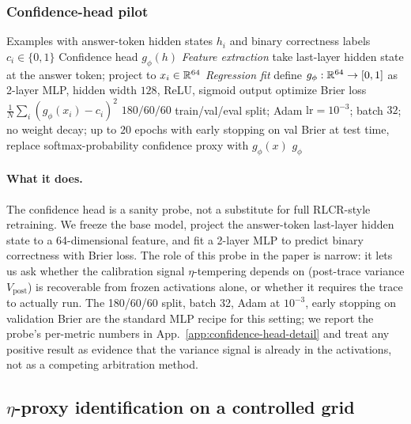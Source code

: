 \subsubsection{Confidence-head pilot}

\begin{algorithm}[H]
\small
\caption{Confidence-head pilot.  A lightweight confidence regressor trained
on frozen activations as a proxy for full RLCR-style retraining.}
\begin{algorithmic}
\Require Examples with answer-token hidden states $h_i$ and binary correctness
labels $c_i\in\{0,1\}$
\Ensure Confidence head $g_\phi(h)$
\Statex \textit{Feature extraction}
  \State take last-layer hidden state at the answer token;
  project to $x_i\in\mathbb{R}^{64}$
\EndFor
\Statex \textit{Regression fit}
\State define $g_\phi:\mathbb{R}^{64}\to[0,1]$ as 2-layer MLP, hidden width $128$,
ReLU, sigmoid output
\State optimize Brier loss $\tfrac{1}{N}\sum_i(g_\phi(x_i)-c_i)^2$
\State $180/60/60$ train/val/eval split; Adam $\mathrm{lr}\!=\!10^{-3}$;
batch $32$; no weight decay; up to $20$ epochs with early stopping on val Brier
\State at test time, replace softmax-probability confidence proxy with $g_\phi(x)$
\State \Return $g_\phi$
\end{algorithmic}
\end{algorithm}

\paragraph{What it does.} The confidence head is a sanity probe, not a substitute for full RLCR-style retraining. We freeze the base model, project the answer-token last-layer hidden state to a 64-dimensional feature, and fit a 2-layer MLP to predict binary correctness with Brier loss. The role of this probe in the paper is narrow: it lets us ask whether the calibration signal $\eta$-tempering depends on (post-trace variance $V_{\mathrm{post}}$) is recoverable from frozen activations alone, or whether it requires the trace to actually run. The 180/60/60 split, batch 32, Adam at $10^{-3}$, early stopping on validation Brier are the standard MLP recipe for this setting; we report the probe's per-metric numbers in App.~\ref{app:confidence-head-detail} and treat any positive result as evidence that the variance signal is already in the activations, not as a competing arbitration method.

\subsection{$\eta$-proxy identification on a controlled grid}
\label{app:eta-proxy-id}


